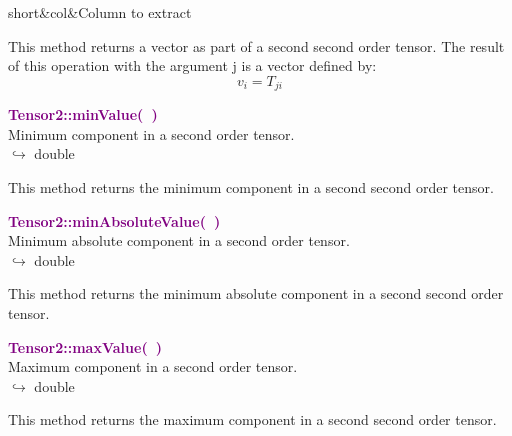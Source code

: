 \begin{tcolorbox}[width=\textwidth,myArgs,tabularx={ll|R}]
short&col&Column to extract
\end{tcolorbox}

This method returns a vector as part of a second second order tensor.
The result of this operation with the argument j is a vector defined by:
\begin{equation*}
v_{i} = T_{ji}
\end{equation*}

\textcolor{purple}{\textbf{Tensor2::minValue(~)}}\label{Tensor2::minValue()}\\
Minimum component in a second order tensor.\\ \hspace*{10mm}$\hookrightarrow$ double

This method returns the minimum component in a second second order tensor.

\textcolor{purple}{\textbf{Tensor2::minAbsoluteValue(~)}}\label{Tensor2::minAbsoluteValue()}\\
Minimum absolute component in a second order tensor.\\ \hspace*{10mm}$\hookrightarrow$ double

This method returns the minimum absolute component in a second second order tensor.

\textcolor{purple}{\textbf{Tensor2::maxValue(~)}}\label{Tensor2::maxValue()}\\
Maximum component in a second order tensor.\\ \hspace*{10mm}$\hookrightarrow$ double

This method returns the maximum component in a second second order tensor.

